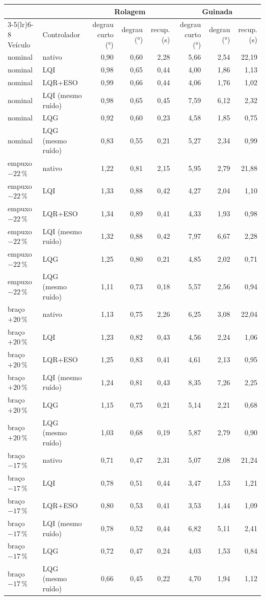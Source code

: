 \begin{tabular}{llrrrrrr}
\toprule
 & & \multicolumn{3}{c}{Rolagem} & \multicolumn{3}{c}{Guinada} \\
\cmidrule(lr){3-5}\cmidrule(lr){6-8}
Veículo & Controlador & degrau curto (\si{\degree}) & degrau (\si{\degree}) & recup. (\si{\second}) & degrau curto (\si{\degree}) & degrau (\si{\degree}) & recup. (\si{\second}) \\
\midrule
nominal & nativo & 0,90 & 0,60 & 2,28 & 5,66 & 2,54 & 22,19 \\
nominal & LQI & 0,98 & 0,65 & 0,44 & 4,00 & 1,86 & 1,13 \\
nominal & LQR+ESO & 0,99 & 0,66 & 0,44 & 4,06 & 1,76 & 1,02 \\
nominal & LQI (mesmo ruído) & 0,98 & 0,65 & 0,45 & 7,59 & 6,12 & 2,32 \\
nominal & LQG & 0,92 & 0,60 & 0,23 & 4,58 & 1,85 & 0,75 \\
nominal & LQG (mesmo ruído) & 0,83 & 0,55 & 0,21 & 5,27 & 2,34 & 0,99 \\
\addlinespace
empuxo $-22\,\%$ & nativo & 1,22 & 0,81 & 2,15 & 5,95 & 2,79 & 21,88 \\
empuxo $-22\,\%$ & LQI & 1,33 & 0,88 & 0,42 & 4,27 & 2,04 & 1,10 \\
empuxo $-22\,\%$ & LQR+ESO & 1,34 & 0,89 & 0,41 & 4,33 & 1,93 & 0,98 \\
empuxo $-22\,\%$ & LQI (mesmo ruído) & 1,32 & 0,88 & 0,42 & 7,97 & 6,67 & 2,28 \\
empuxo $-22\,\%$ & LQG & 1,25 & 0,80 & 0,21 & 4,85 & 2,02 & 0,71 \\
empuxo $-22\,\%$ & LQG (mesmo ruído) & 1,11 & 0,73 & 0,18 & 5,57 & 2,56 & 0,94 \\
\addlinespace
braço $+20\,\%$ & nativo & 1,13 & 0,75 & 2,26 & 6,25 & 3,08 & 22,04 \\
braço $+20\,\%$ & LQI & 1,23 & 0,82 & 0,43 & 4,56 & 2,24 & 1,06 \\
braço $+20\,\%$ & LQR+ESO & 1,25 & 0,83 & 0,41 & 4,61 & 2,13 & 0,95 \\
braço $+20\,\%$ & LQI (mesmo ruído) & 1,24 & 0,81 & 0,43 & 8,35 & 7,26 & 2,25 \\
braço $+20\,\%$ & LQG & 1,15 & 0,75 & 0,21 & 5,14 & 2,21 & 0,68 \\
braço $+20\,\%$ & LQG (mesmo ruído) & 1,03 & 0,68 & 0,19 & 5,87 & 2,79 & 0,90 \\
\addlinespace
braço $-17\,\%$ & nativo & 0,71 & 0,47 & 2,31 & 5,07 & 2,08 & 21,24 \\
braço $-17\,\%$ & LQI & 0,78 & 0,51 & 0,44 & 3,47 & 1,53 & 1,21 \\
braço $-17\,\%$ & LQR+ESO & 0,80 & 0,53 & 0,41 & 3,53 & 1,44 & 1,09 \\
braço $-17\,\%$ & LQI (mesmo ruído) & 0,78 & 0,52 & 0,44 & 6,82 & 5,11 & 2,41 \\
braço $-17\,\%$ & LQG & 0,72 & 0,47 & 0,24 & 4,03 & 1,53 & 0,84 \\
braço $-17\,\%$ & LQG (mesmo ruído) & 0,66 & 0,45 & 0,22 & 4,70 & 1,94 & 1,12 \\
\bottomrule
\end{tabular}
